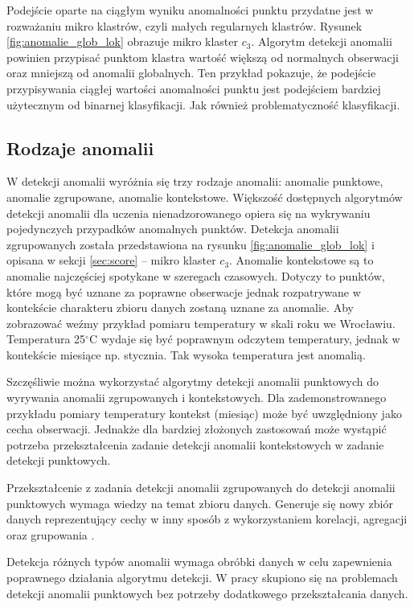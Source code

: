 Podejście oparte na ciągłym wyniku anomalności punktu przydatne jest w rozważaniu mikro klastrów, czyli małych regularnych klastrów. Rysunek \ref{fig:anomalie_glob_lok} obrazuje mikro klaster $c_3$. Algorytm detekcji anomalii powinien przypisać punktom klastra wartość większą od normalnych obserwacji oraz mniejszą od anomalii globalnych. Ten przykład pokazuje, że podejście przypisywania ciągłej wartości anomalności punktu jest podejściem bardziej użytecznym od binarnej klasyfikacji. Jak również problematyczność klasyfikacji.

\subsection{Rodzaje anomalii}
W detekcji anomalii wyróżnia się trzy rodzaje anomalii: anomalie punktowe, anomalie zgrupowane, anomalie kontekstowe.
Większość dostępnych algorytmów detekcji anomalii dla uczenia nienadzorowanego opiera się na wykrywaniu pojedynczych przypadków anomalnych punktów. Detekcja anomalii zgrupowanych została przedstawiona na rysunku \ref{fig:anomalie_glob_lok} i opisana w sekcji \ref{sec:score} -- mikro klaster $c_3$.
Anomalie kontekstowe są to anomalie najczęściej spotykane w szeregach czasowych. Dotyczy to punktów, które mogą być uznane za poprawne obserwacje jednak rozpatrywane w kontekście charakteru zbioru danych zostaną uznane za anomalie. Aby zobrazować weźmy przykład pomiaru temperatury w skali roku we Wrocławiu. Temperatura 25$^{\circ}$C wydaje się być poprawnym odczytem temperatury, jednak w kontekście miesiące np. stycznia. Tak wysoka temperatura jest anomalią.

Szczęśliwie można wykorzystać algorytmy detekcji anomalii punktowych do wyrywania anomalii zgrupowanych i kontekstowych. Dla zademonstrowanego przykładu pomiary temperatury kontekst (miesiąc) może być uwzględniony jako cecha obserwacji. Jednakże dla bardziej złożonych zastosowań może wystąpić potrzeba przekształcenia zadanie detekcji anomalii kontekstowych w zadanie detekcji punktowych. 

Przekształcenie z zadania detekcji anomalii zgrupowanych do detekcji anomalii punktowych wymaga wiedzy na temat zbioru danych. Generuje się nowy zbiór danych reprezentujący cechy w inny sposób z wykorzystaniem korelacji, agregacji oraz grupowania \cite{goldstein2014behavior}. 

Detekcja różnych typów anomalii wymaga obróbki danych w celu zapewnienia poprawnego działania algorytmu detekcji. W pracy skupiono się na problemach detekcji anomalii punktowych bez potrzeby dodatkowego przekształcania danych.

